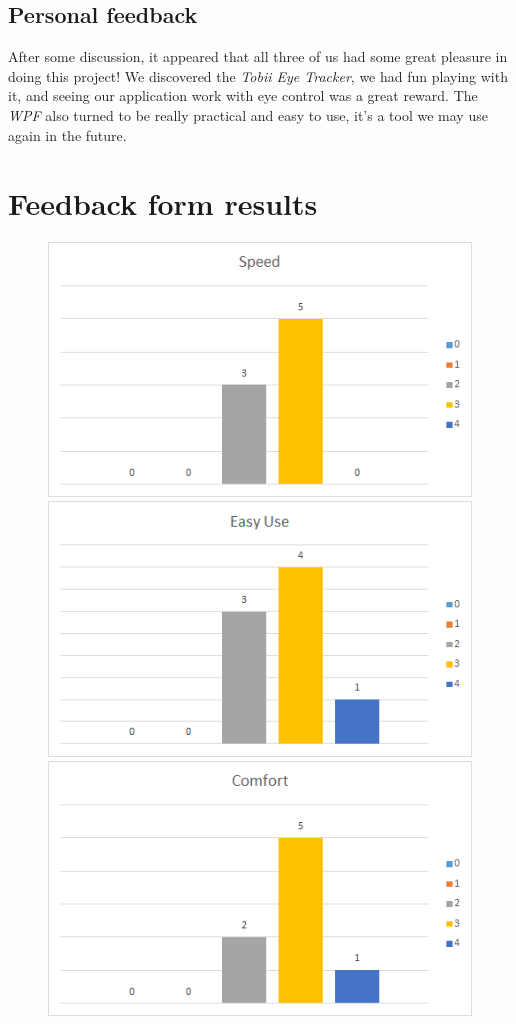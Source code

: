 \documentclass[12pt, a4paper]{article}
\begin{document}
\subsection{Personal feedback}
After some discussion, it appeared that all three of us had some great pleasure in doing this project! We discovered the \textit{Tobii Eye Tracker}, we had fun playing with it, and seeing our application work with eye control was a great reward. The \textit{WPF} also turned to be really practical and easy to use, it's a tool we may use again in the future. \\
\newpage
\appendix
\section{Feedback form results}
\label{FormResults}
\begin{figure}[H]
\includegraphics[scale =.6]{Speed}
\includegraphics[scale =.6]{EaseOfUse}
\includegraphics[scale =.6]{Comfort}

\end{figure}
\end{document}
